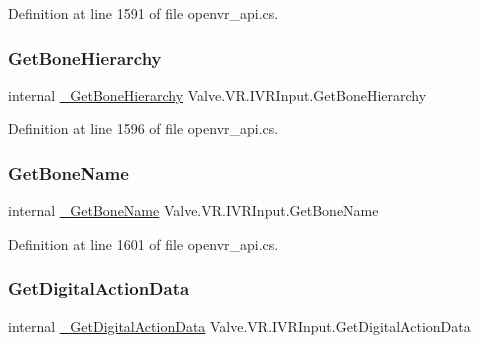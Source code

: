 Definition at line 1591 of file openvr\+\_\+api.\+cs.

\mbox{\label{struct_valve_1_1_v_r_1_1_i_v_r_input_a11001075e37728a43dbf3af84bdb8140}} 
\subsubsection{\texorpdfstring{GetBoneHierarchy}{GetBoneHierarchy}}
{\footnotesize\ttfamily internal \mbox{\hyperlink{struct_valve_1_1_v_r_1_1_i_v_r_input_a1e1830a194a220b6947473ecfb0966db}{\+\_\+\+Get\+Bone\+Hierarchy}} Valve.\+V\+R.\+I\+V\+R\+Input.\+Get\+Bone\+Hierarchy}



Definition at line 1596 of file openvr\+\_\+api.\+cs.

\mbox{\label{struct_valve_1_1_v_r_1_1_i_v_r_input_a34221d6f94345f4c7f2621a55978a202}} 
\subsubsection{\texorpdfstring{GetBoneName}{GetBoneName}}
{\footnotesize\ttfamily internal \mbox{\hyperlink{struct_valve_1_1_v_r_1_1_i_v_r_input_ab946688fdae1876df1fa3c06426579cf}{\+\_\+\+Get\+Bone\+Name}} Valve.\+V\+R.\+I\+V\+R\+Input.\+Get\+Bone\+Name}



Definition at line 1601 of file openvr\+\_\+api.\+cs.

\mbox{\label{struct_valve_1_1_v_r_1_1_i_v_r_input_a77204548e75501e650980f77a8516ba7}} 
\subsubsection{\texorpdfstring{GetDigitalActionData}{GetDigitalActionData}}
{\footnotesize\ttfamily internal \mbox{\hyperlink{struct_valve_1_1_v_r_1_1_i_v_r_input_a376552d06df56ac9589e5014e3f04908}{\+\_\+\+Get\+Digital\+Action\+Data}} Valve.\+V\+R.\+I\+V\+R\+Input.\+Get\+Digital\+Action\+Data}



